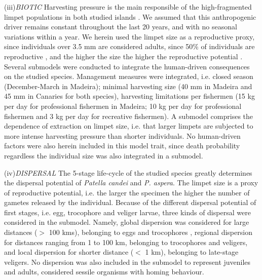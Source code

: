 \documentclass[12pt]{article}
\begin{document}
\begin{flushleft}
{{{{{(iii)\textit{BIOTIC}
Harvesting pressure is the main responsible of the high-fragmented limpet populations in both studied islands \citep{riera2016clear,sousa2019long}. We assumed that this anthropogenic driver remains constant throughout the last 20 years, and with no seasonal variations within a year. We herein used the limpet size as a reproductive proxy, since individuals over 3.5 mm are considered adults, since 50\% of individuals are reproductive \citep{henriques2012life}, and the higher the size the higher the reproductive potential \citep{boaventura2002analysis, martins2017exploitation}. Several submodels were conducted to integrate the human-driven consequences on the studied species. Management measures were integrated, i.e. closed season (December-March in Madeira); minimal harvesting size (40 mm in Madeira and 45 mm in Canaries for both species), harvesting limitations per fishermen (15 kg per day for professional fishermen in Madeira; 10 kg per day for professional fishermen and 3 kg per day for recreative fishermen). A submodel comprises the dependence of extraction on limpet size, i.e. that larger limpets are subjected to more intense harvesting pressure than shorter individuals.
No human-driven factors were also herein included in this model trait, since death probability regardless the individual size was also integrated in a submodel.

(iv)\textit{DISPERSAL}
The 5-stage life-cycle of the studied species greatly determines the dispersal potential of \textit{Patella candei} and \textit{P. aspera}. The limpet size is a proxy of reproductive potential, i.e. the larger the specimen the higher the number of gametes released by the individual. Because of the different dispersal potential of first stages, i.e. egg, trocophore and veliger larvae, three kinds of dispersal were considered in the submodel. Namely, global dispersion was considered for large distances ($>$ 100 kms), belonging to eggs and trocophores , regional dispersion for distances ranging from 1 to 100 km, belonging to trocophores and veligers, and local dispersion for shorter distance ($<$ 1 km), belonging to late-stage veligers. No dispersion was also included in the submodel to represent juveniles and adults, considered sessile organisms with homing behaviour.

}}}}}
\end{flushleft}
\end{document}
